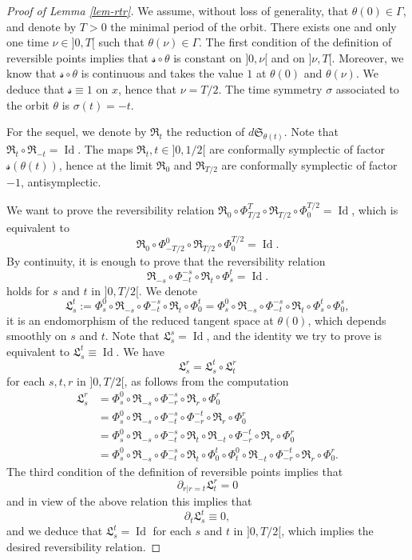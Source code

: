 \documentclass[10pt]{amsart}
\DeclareMathOperator{\Id}{Id}
\newcommand{\gL}{\ensuremath{\mathfrak{L}}}
\newcommand{\gR}{\ensuremath{\mathfrak{R}}}
\newcommand{\gS}{\ensuremath{\mathfrak{S}}}
\newcommand{\ms}{\ensuremath{\mathscr{s}}}
\theoremstyle{plain}
\theoremstyle{definition}
\begin{document}
\begin{proof}[Proof of Lemma \ref{lem-rtr}]
We assume, without loss of generality, that $\theta(0)\in \Gamma$, and denote by $T>0$ the minimal period of the orbit.
There exists one and only one time $\nu\in{}]0,T[$ such that $\theta (\nu)\in \Gamma$.
The first condition of the definition of reversible points implies that $ \ms\circ \theta$ is constant on $]0,\nu[$ and
on $]\nu,T[$. Moreover, we know that $\ms\circ \theta$ is continuous and takes the value $1$ at $\theta(0)$ and $\theta(\nu)$.
We deduce that $\ms\equiv 1$ on $x$, hence that $\nu=T/2$. The time symmetry $\sigma$ associated to the orbit $\theta$ is
$\sigma (t)=-t$.

For the sequel, we denote by $\gR_t$ the reduction of $d\gS_{\theta(t)}$. Note that $\gR_t\circ \gR_{-t}=\Id$.
The maps $\gR_t, t\in{}]0,1/2[$ are conformally symplectic of factor $\ms(\theta(t))$, hence at the limit $\gR_0$ and $\gR_{T/2}$
are conformally symplectic of factor $-1$, \ie antisymplectic.

We want to prove the reversibility relation
$
\gR_0\circ \Phi_{T/2}^T\circ \gR_{T/2}\circ \Phi_{0}^{T/2}=\Id
$,
which is equivalent to
\[
\gR_0\circ \Phi_{-T/2}^0\circ \gR_{T/2}\circ \Phi_{0}^{T/2}=\Id.
\]
By continuity, it is enough to prove that the reversibility relation
\[
\gR_{-s}\circ \Phi_{-t}^{-s}\circ\gR_{t}\circ \Phi_s^t=\Id.
\]
holds for $s$ and $t$ in $]0,T/2[$.
We denote
\[
\gL_s^t:=
\Phi_s^0 \circ
\gR_{-s}\circ \Phi_{-t}^{-s}\circ\gR_{t}\circ \Phi_0^t
=\Phi_s^0
\circ
\gR_{-s}\circ \Phi_{-t}^{-s}\circ\gR_{t}\circ \Phi_s^t\circ \Phi_0^s,
\]
it is an endomorphism of the reduced tangent space at $\theta(0)$, which depends smoothly on $s$ and $t$.
Note that $\gL_s^s=\Id$, and the identity we try to prove is equivalent to $\gL_s^t\equiv \Id$.
We have
\[
\gL_s^r=\gL_s^t\circ \gL_t^r
\]
for each $s,t,r$ in $]0,T/2[$, as follows from the computation
\begin{align*}
\gL_s^r
&= \Phi_s^0 \circ \gR_{-s}\circ \Phi_{-r}^{-s}\circ\gR_{r}\circ \Phi_0^r\\
&=\Phi_s^0 \circ \gR_{-s}\circ \Phi_{-t}^{-s}\circ \Phi_{-r}^{-t}\circ \gR_{r}\circ \Phi_0^r\\
&=\Phi_s^0 \circ \gR_{-s}\circ \Phi_{-t}^{-s}\circ \gR_t\circ \gR_{-t}\circ \Phi_{-r}^{-t}\circ \gR_{r}\circ \Phi_0^r\\
&=\Phi_s^0 \circ \gR_{-s}\circ \Phi_{-t}^{-s}\circ \gR_t\circ \Phi_0^t\circ \Phi_t^0\circ \gR_{-t}\circ \Phi_{-r}^{-t}\circ \gR_{r}\circ \Phi_0^r.
\end{align*}
The third condition of the definition of reversible points implies that
\[
\partial_{r|r=t}\gL_t^r=0\]
and in view of the above relation this implies that
\[
\partial_t \gL_s^t\equiv 0,\]
and we deduce that $\gL_s^t=\Id$ for each $s$ and $t$ in $]0,T/2[$, which implies the desired reversibility relation.
\end{proof}
\end{document}
